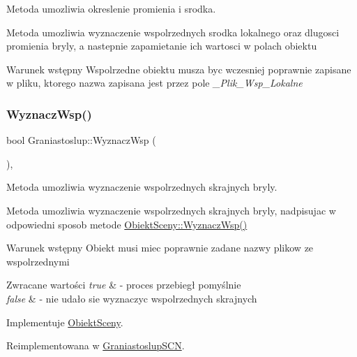 Metoda umozliwia okreslenie promienia i srodka. 

Metoda umozliwia wyznaczenie wspolrzednych srodka lokalnego oraz dlugosci promienia bryly, a nastepnie zapamietanie ich wartosci w polach obiektu \begin{DoxyPrecond}{Warunek wstępny}
Wspolrzedne obiektu musza byc wczesniej poprawnie zapisane w pliku, ktorego nazwa zapisana jest przez pole {\itshape \+\_\+\+Plik\+\_\+\+Wsp\+\_\+\+Lokalne} 
\end{DoxyPrecond}
\mbox{\label{classGraniastoslup_a786313962b174b9c25084e45e827f39b}} 
\subsubsection{\texorpdfstring{Wyznacz\+Wsp()}{WyznaczWsp()}}
{\footnotesize\ttfamily bool Graniastoslup\+::\+Wyznacz\+Wsp (\begin{DoxyParamCaption}{ }\end{DoxyParamCaption})\hspace{0.3cm}{\ttfamily [override]}, {\ttfamily [virtual]}}



Metoda umozliwia wyznaczenie wspolrzednych skrajnych bryly. 

Metoda umozliwia wyznaczenie wspolrzednych skrajnych bryly, nadpisujac w odpowiedni sposob metode \hyperlink{classObiektSceny_a24dd0332c0755d7155128639a9a3e2b4}{Obiekt\+Sceny\+::\+Wyznacz\+Wsp()}

\begin{DoxyPrecond}{Warunek wstępny}
Obiekt musi miec poprawnie zadane nazwy plikow ze wspolrzednymi 
\end{DoxyPrecond}

\begin{DoxyRetVals}{Zwracane wartości}
{\em true} & -\/ proces przebiegł pomyślnie \\
\hline
{\em false} & -\/ nie udało sie wyznaczyc wspolrzednych skrajnych \\
\hline
\end{DoxyRetVals}


Implementuje \hyperlink{classObiektSceny_a24dd0332c0755d7155128639a9a3e2b4}{Obiekt\+Sceny}.



Reimplementowana w \hyperlink{classGraniastoslupSCN_a096492db05264adae9306f5fb50cc3c9}{Graniastoslup\+S\+CN}.



